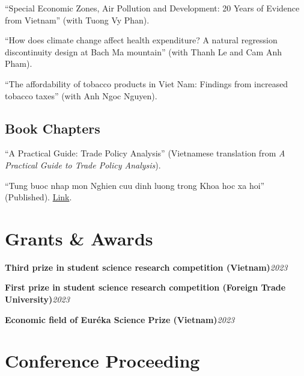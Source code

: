 \documentclass[10.5pt]{article}
\begin{document}
\begin{enumerate}[label={[\arabic*]}]
\item ``Special Economic Zones, Air Pollution and Development: 20 Years of Evidence from Vietnam'' (with Tuong Vy Phan).
\item ``How does climate change affect health expenditure? A natural regression discontinuity design at Bach Ma mountain'' (with Thanh Le and Cam Anh Pham).
\item ``The affordability of tobacco products in Viet Nam: Findings from increased tobacco taxes'' (with Anh Ngoc Nguyen).
\end{enumerate}

\subsection{Book Chapters}
\begin{enumerate}[label={[\arabic*]}]
\item ``A Practical Guide: Trade Policy Analysis'' (Vietnamese translation from \textit{A Practical Guide to Trade Policy Analysis}).
\item ``Tung buoc nhap mon Nghien cuu dinh luong trong Khoa hoc xa hoi'' (Published). \href{https://iper.org.vn/tung-buoc-nhap-mon-nghien-cuu-dinh-luong-trong-khoa-hoc-xa-hoi/?fbclid=IwY2xjawHgVrpleHRuA2FlbQIxMAABHa6F89lOrPrL6ttiGWy61X8z5VlsBT-hDcrzjIUt9oHilFVG-pKhTq2CUQ_aem_buxMo8Ym0baFn8OR_dPpAw}{Link}.
\end{enumerate}


\section{Grants \& Awards}

\textbf{Third prize in student science research competition (Vietnam)}\hfill \emph{2023}

\textbf{First prize in student science research competition (Foreign Trade University)}\hfill \emph{2023}

\textbf{Economic field of Eur\'eka Science Prize (Vietnam)}\hfill \emph{2023}


\section{Conference Proceeding}
\end{document}
